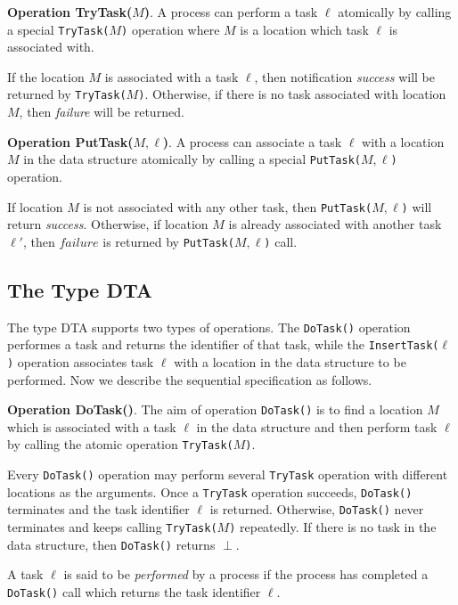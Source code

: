\textbf{Operation TryTask($M$)}.
A process can perform a task $\ell$ atomically by calling a special
\texttt{TryTask(}$M$\texttt{)} operation where $M$ is a location which task $\ell$
is associated with.

If the location $M$ is associated with a task $\ell$, then notification \emph{success} will be returned
by \texttt{TryTask(}$M$\texttt{)}.
Otherwise, if there is no task associated with location $M$, then \emph{failure} will be
returned.

\textbf{Operation PutTask($M,\ell$)}.
A process can associate a task $\ell$ with a location $M$ in the data structure
atomically by calling a special \texttt{PutTask(}$M,\ell$\texttt{)} operation.

If location $M$ is not associated with any other task, then \texttt{PutTask(}$M,\ell$\texttt{)} will return \emph{success}.
Otherwise, if location $M$ is already associated with another task $\ell'$, then $failure$ is returned
by \texttt{PutTask(}$M,\ell$\texttt{)} call.

\subsection{The Type DTA}

The type DTA supports two types of operations. The \texttt{DoTask()} operation performes a task
and returns the identifier of that task, while the \texttt{InsertTask(}$\ell$\texttt{)} operation associates task
$\ell$ with a location in the data structure to be performed. Now we describe the sequential specification
as follows.

\textbf{Operation DoTask()}.
The aim of operation \texttt{DoTask()} is to find a location $M$ which is associated with a task
$\ell$ in the data structure and then perform task $\ell$ by calling the atomic operation \texttt{TryTask(}$M$\texttt{)}.

Every \texttt{DoTask()} operation may perform several \texttt{TryTask} operation with different locations as the
arguments. Once a \texttt{TryTask} operation succeeds, \texttt{DoTask()} terminates and
the task identifier $\ell$ is returned. Otherwise, \texttt{DoTask()} never terminates and keeps calling
\texttt{TryTask(}$M$\texttt{)} repeatedly. If there is no task in the data structure,
then \texttt{DoTask()} returns $\perp$.

A task $\ell$ is said to be \emph{performed} by a process if the process has completed a \texttt{DoTask()} call
which returns the task identifier $\ell$.

